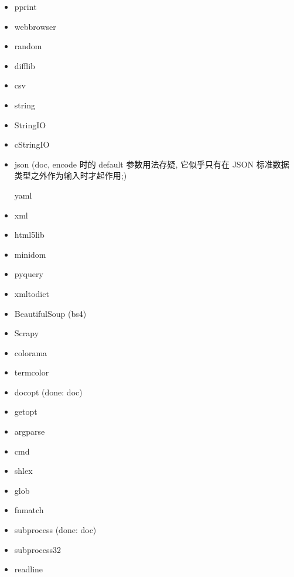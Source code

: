\documentclass{article}
\begin{document}
\begin{enumerate}
\begin{itemize}
            \item pprint
            \item webbrowser
            \item random
            \item difflib
            \item csv

            \item string
            \item StringIO
            \item cStringIO

            \item json (doc, encode 时的 default 参数用法存疑, 它似乎只有在 JSON 标准数据类型之外作为输入时才起作用;)

            \itme yaml

            \item xml
            \item html5lib
            \item minidom
            \item pyquery
            \item xmltodict
            \item BeautifulSoup (bs4)
            \item Scrapy

            \item colorama
            \item termcolor
            \item docopt (done: doc)
            \item getopt
            \item argparse
            \item cmd
            \item shlex
            \item glob
            \item fnmatch
            \item subprocess (done: doc)
            \item subprocess32
            \item readline


\end{itemize}
\end{enumerate}
\end{document}
